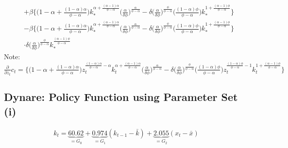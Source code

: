 \documentclass[a4paper]{article}
\theoremstyle{definition}
\begin{document}
\begin{align*}
											&+ \beta \Big\{ \Big( 1-\alpha+\frac{(1-\alpha)\alpha}{\phi-\alpha} \Big) k_{*}^{\alpha+\frac{(\alpha-1)\alpha}{\phi-\alpha}} \Big( \frac{\alpha}{\delta\phi} \Big)^{\frac{\alpha}{\phi-\alpha}} - \delta \Big( \frac{\alpha}{\delta\phi} \Big)^{\frac{\phi}{\phi-\alpha}} \Big( \frac{(1-\alpha)\phi}{\phi-\alpha} \Big) k_{*}^{1+\frac{(\alpha-1)\phi}{\phi-\alpha}} \Big\} \\
											&- \beta \Big\{ \Big( 1-\alpha+\frac{(1-\alpha)\alpha}{\phi-\alpha} \Big) k_{*}^{\alpha+\frac{(\alpha-1)\alpha}{\phi-\alpha}} \Big( \frac{\alpha}{\delta\phi} \Big)^{\frac{\alpha}{\phi-\alpha}} - \delta \Big( \frac{\alpha}{\delta\phi} \Big)^{\frac{\phi}{\phi-\alpha}} \Big( \frac{(1-\alpha)\phi}{\phi-\alpha} \Big) k_{*}^{1+\frac{(\alpha-1)\phi}{\phi-\alpha}} \Big\}\\
											& \cdot \delta \Big( \frac{\alpha}{\delta\phi} \Big)^{\frac{\phi}{\phi-\alpha}} k_{*}^{\frac{(\alpha-1)\phi}{\phi-\alpha}}						
	\end{align*}
Note: $\frac{\partial}{\partial z_t}c_t = \Big\{ \Big( 1-\alpha+\frac{(1-\alpha)\alpha}{\phi-\alpha} \Big) z_{t}^{\frac{(1-\alpha)\alpha}{\phi-\alpha}-\alpha} k_{t}^{\alpha+\frac{(\alpha-1)\alpha}{\phi-\alpha}} \Big( \frac{\alpha}{\delta\phi} \Big)^{\frac{\alpha}{\phi-\alpha}} - \delta \Big( \frac{\alpha}{\delta\phi} \Big)^{\frac{\phi}{\phi-\alpha}} \Big( \frac{(1-\alpha)\phi}{\phi-\alpha} \Big) z_{t}^{\frac{(1-\alpha)\phi}{\phi-\alpha}-1}k_{t}^{1+\frac{(\alpha-1)\phi}{\phi-\alpha}} \Big\}$



%
%
%
%
%
%
%
%
%
%
%
%
%
%
%
%
\newpage
\subsection{Dynare: Policy Function using Parameter Set (i)}
	\begin{align*}
	k_t = \underbrace{60.62}_{=G_0} + \underbrace{0.974}_{=G_1} (k_{t-1}-\bar k) + \underbrace{2.055}_{=G_2} (x_t-\bar x)
	\end{align*}
\end{document}
